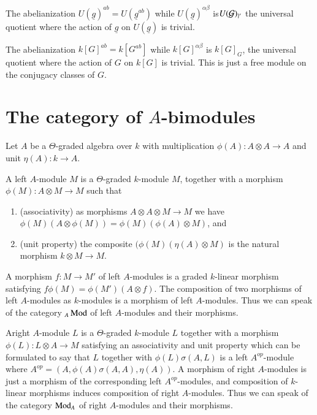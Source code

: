 \begin{example}\label{chap2-exam4.6}
The abelianization $U(\underline{g})^{ab}=U(\underline{g}^{ab})$ while
$U(\underline{g})^{\alpha\beta}$ is\break $U(\mathcal{G})_{\}'}$ the universal
quotient where the action of $\underline{g}$ on $U(\underline{g})$ is
trivial. 
\end{example}

\begin{example}\label{chap2-examp4.7}
The abelianization $k[G]^{ab}=k[G^{ab}]$ while $k[G]^{\alpha\beta}$ is\break
$k[G]_{G}$, the universal quotient where the action of $G$ on $k[G]$
is trivial. This is just a free module on the conjugacy classes of $G$.
\end{example}

\section{The category of $A$-bimodules}\label{chap2-sec5}

Let $A$ be a $\Theta$-graded algebra over $k$ with multiplication
$\phi(A):A\otimes A\to A$ and unit $\eta(A):k\to A$.

\begin{definition}\label{chap2-defi5.1}
A left $A$-module $M$ is a $\Theta$-graded $k$-module $M$, together
with a morphism $\phi(M):A\otimes M\to M$ such that
\begin{enumerate}
\renewcommand{\labelenumi}{(\theenumi)}
\item (associativity) as morphisms $A\otimes A\otimes M\to M$ we have
  $\phi(M)(A\otimes \phi(M))=\phi(M)(\phi(A)\otimes M)$, and

\item (unit property) the composite $(\phi(M)(\eta(A)\otimes M)$ is
  the natural morphism $k\otimes M\to M$.
\end{enumerate}

A morphism $f:M\to M'$ of left $A$-modules is a graded $k$-linear
morphism satisfying $f\phi(M)=\phi(M')(A\otimes f)$. The composition
of two morphisms of left $A$-modules as $k$-modules is a morphism of
left $A$-modules. Thus we can speak of the category ${}_{A}\operatorname{Mod}$ of
left $A$-modules and their morphisms. 
\end{definition}

\begin{definition}\label{chap2-defi5.2}
A\pageoriginale right $A$-module $L$ is a $\Theta$-graded $k$-module
$L$ together with a morphism $\phi(L):L\otimes A\to M$ satisfying an
associativity and unit property which can be formulated to say that
$L$ together with $\phi(L)\sigma(A,L)$ is a left $A^{op}$-module where
$A^{op}=(A,\phi(A)\sigma(A,A),\eta(A))$. A morphism of right
$A$-modules is just a morphism of the corresponding left
$A^{op}$-modules, and composition of $k$-linear morphisms induces
composition of right $A$-modules. Thus we can speak of the category
$\operatorname{Mod}_{A}$ of right $A$-modules and their morphisms. 
\end{definition}


